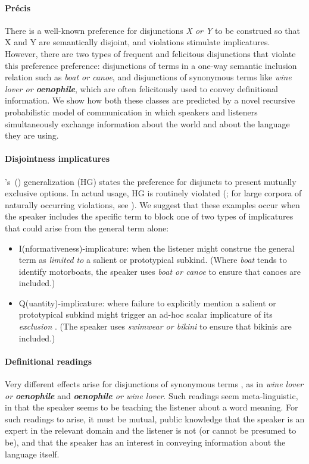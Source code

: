\documentclass[12pt]{article}
\newcommand{\word}[1]{\emph{#1}}
\newcommand{\posscitet}[1]{\citeauthor{#1}'s~(\citeyear{#1})}
\begin{document}
\paragraph{Pr{\'e}cis}
There is a well-known preference for disjunctions \word{X or Y} to be
construed so that X and Y are semantically disjoint, and violations
stimulate implicatures.  However, there are two types of frequent and
felicitous disjunctions that violate this preference preference:
disjunctions of terms in a one-way semantic inclusion relation such as
\word{boat or canoe}, and disjunctions of synonymous terms like
\word{wine lover or \textbf{oenophile}}, which are often felicitously
used to convey definitional information.  We show how both these
classes are predicted by a novel recursive probabilistic model of
communication in which speakers and listeners simultaneously exchange
information about the world and about the language they are using.

\paragraph{Disjointness implicatures}
\posscitet{Hurford:1974} generalization (HG) states the preference for
disjuncts to present mutually exclusive options. In actual usage, HG
is routinely violated (\citealt{Rohdenburg:1985}; for large corpora of
naturally occurring violations, see
\citealt{Potts13MICH,Chemla-HurfordCounts}).  We suggest that these
examples occur when the speaker includes the specific term to block
one of two types of implicatures \citep{levinson:2000} that could arise from the general
term alone:

\begin{itemize}
\item I(nformativeness)-implicature: when the listener might 
  construe the general term as \emph{limited to} a salient or prototypical
  subkind. (Where \word{boat} tends to identify motorboats, the
  speaker uses \emph{boat or canoe} to ensure that
  canoes are included.)

\item Q(uantity)-implicature: where failure to explicitly mention a
  salient or prototypical subkind might trigger an ad-hoc scalar
  implicature of its \emph{exclusion} \citep{hirschberg:1985}. (The
  speaker uses \emph{swimwear or bikini} to ensure that bikinis are
  included.)
\end{itemize}

\paragraph{Definitional readings} Very different effects arise for
disjunctions of synonymous terms \citep{Horn89,Rohdenburg:1985}, as in
\word{wine lover or \textbf{oenophile}} and \word{\textbf{oenophile}
  or wine lover}. Such readings seem meta-linguistic, in that the
speaker seems to be teaching the listener about a word meaning. For
such readings to arise, it must be mutual, public knowledge that the
speaker is an expert in the relevant domain and the listener is not
(or cannot be presumed to be), and that the speaker has an interest in
conveying information about the language itself.
\end{document}
